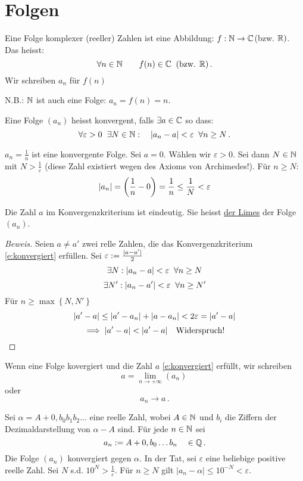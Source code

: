 \section{Folgen}
\begin{Def}
  Eine Folge komplexer (reeller) Zahlen ist eine Abbildung: $f:\mathbb{N}\to\mathbb{C}$(bzw. $\mathbb{R})$. Das heisst:
  \[\forall n\in\mathbb{N}\qquad f(n)\in\mathbb{C}\;\;(\mbox{bzw. }\mathbb{R})\, .\]
Wir schreiben $a_n$ f\"ur $f(n)$
 \end{Def}
N.B.: $\mathbb{N}$ ist auch eine Folge: $a_n=f(n)=n$.
\begin{Def}
  Eine Folge $(a_n)$ heisst konvergent, falls $\exists a\in\mathbb{C}$ so dass:
\begin{equation}\label{e:konvergiert}
 \forall\varepsilon>0\hspace{2mm}\exists N\in\mathbb{N}:\quad\mathopen| a_n-a \mathclose|<\varepsilon\hspace{2mm}\forall n\geq N\, .
\end{equation}
\end{Def}
\begin{Bsp}
  $a_n=\frac{1}{n}$ ist eine konvergente Folge. Sei $a=0$. Wählen wir $\varepsilon>0$. 
Sei dann $N\in \mathbb{N}$ mit $N>\frac{1}{\varepsilon}$ (diese Zahl existiert wegen des
Axioms von Archimedes!). F\"ur $n\geq N$:
  \[\mathopen| a_n \mathclose|=\left( \frac{1}{n}-0 \right)=\frac{1}{n}\leq\frac{1}{N} < \varepsilon\]
\end{Bsp}
\begin{Bem}
  Die Zahl $a$ im Konvergenzkriterium ist eindeutig. Sie heisst \ul{der Limes} der Folge $(a_n)$.
\end{Bem}
\begin{proof}[Beweis]
  Seien $a\neq a'$ zwei relle Zahlen, die das Konvergenzkriterium \eqref{e:konvergiert}
erf\"ullen. Sei $\varepsilon:=\frac{\mathopen| a-a' \mathclose|}{2}$
  \[\exists N:\mathopen| a_n-a \mathclose|<\varepsilon\hspace{2mm}\forall n\geq N\]
  \[\exists N':\mathopen| a_n-a' \mathclose|<\varepsilon\hspace{2mm}\forall n\geq N'\]
  Für $n\geq \max \left\{ N,N' \right\}$
  \[\mathopen| a'-a \mathclose|\leq\mathopen| a'-a_n \mathclose|+\mathopen| a-a_n \mathclose|<2\varepsilon=\mathopen| a'-a \mathclose|\]
  \[\implies \mathopen| a'-a \mathclose|<\mathopen| a'-a \mathclose|\quad \mbox{Widerspruch!}\]
\end{proof}
Wenn eine Folge kovergiert und die Zahl $a$ \eqref{e:konvergiert} erf\"ullt, wir schreiben
$$ 
a=\lim_{n\to+\infty}(a_n)\, 
$$
oder
$$
a_n\to a\, .
$$
\begin{Bem} Sei $\alpha = A+ 0,b_0 b_1 b_2\ldots $ eine reelle Zahl, wobei $A\in \mathbb{N}$ und $b_i$ die
Ziffern der Dezimaldarstellung von $\alpha-A$ sind. F\"ur jede $n\in \mathbb{N}$ sei
$$
a_n := A + 0,b_0\ldots b_n \quad\in \mathbb{Q}\, .
$$
Die Folge $(a_n)$ konvergiert gegen $\alpha$. In der Tat, sei $\varepsilon$ eine beliebige
positive reelle Zahl. Sei $N$ s.d. $10^N > \frac{1}{\varepsilon}$. F\"ur $n\geq N$ gilt
$|a_n-\alpha|\leq 10^{-N} < \varepsilon$.
\end{Bem}
